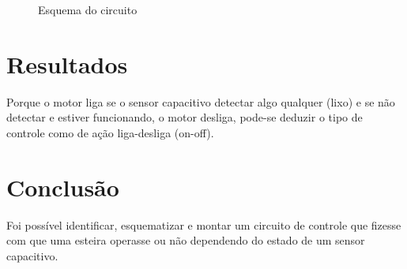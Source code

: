 \documentclass{article}
\begin{document}
\begin{figure}[h!]
\centering
\def\svgwidth{1\columnwidth}

\caption{Esquema do circuito}
\end{figure}

\section{Resultados}

Porque o motor liga se o sensor capacitivo detectar algo qualquer (lixo) e se não detectar e estiver funcionando, o motor desliga, pode-se deduzir o tipo de controle como de ação liga-desliga (on-off).

\section{Conclusão}

Foi possível identificar, esquematizar e montar um circuito de controle que fizesse com que uma esteira operasse ou não dependendo do estado de um sensor capacitivo.
\end{document}
